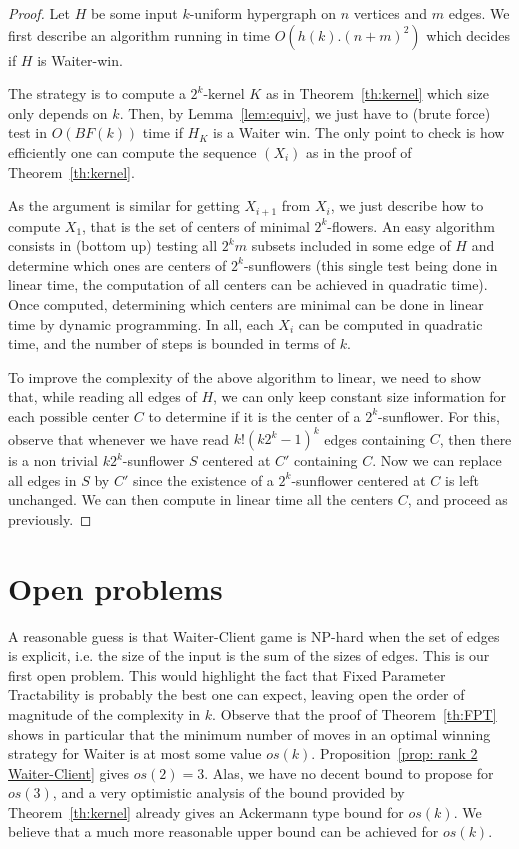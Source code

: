 \documentclass{article}
\newcommand{\hedge}{edge\xspace}
\newcommand{\hedges}{edges\xspace}
\begin{document}
\begin{proof}
Let $H$ be some input $k$-uniform hypergraph on $n$ vertices and $m$ \hedges. We first describe an algorithm running in time $O(h(k).(n+m)^2)$ which decides if $H$ is Waiter-win. 

The strategy is to compute a $2^k$-kernel $K$ as in Theorem~\ref{th:kernel} which size only depends on $k$. Then, by Lemma~\ref{lem:equiv}, we just have to (brute force) test in $O(BF(k))$ time if $H_K$ is a Waiter win. The only point to check is how efficiently one can compute the sequence $(X_i)$ as in the proof of Theorem~\ref{th:kernel}.

As the argument is similar for getting $X_{i+1}$ from $X_i$, we just describe how to compute $X_1$, that is the set of centers of minimal $2^k$-flowers. An easy algorithm consists in (bottom up) testing  all $2^k m$ subsets included in some \hedge of $H$ and determine which ones are centers of $2^k$-sunflowers (this single test being done in linear time, the computation of all centers can be achieved in quadratic time). Once computed, determining which centers are minimal can be done in linear time by dynamic programming. In all, each $X_i$ can be computed in quadratic time, and the number of steps is bounded in terms of $k$.

To improve the complexity of the above algorithm to linear, we need to show that, while reading all \hedges of $H$, we can only keep constant size information for each possible center $C$ to determine if it is the center of a $2^k$-sunflower. For this, observe that whenever we have read $k!(k2^k-1)^k$ \hedges containing $C$, then there is a non trivial $k2^k$-sunflower $S$ centered at $C'$ containing $C$. Now we can replace all \hedges in $S$ by $C'$ since the existence of a $2^k$-sunflower centered at $C$ is left unchanged. We can then compute in linear time all the centers $C$, and proceed as previously.
\end{proof}



\section{Open problems} \label{sec: open}

A reasonable guess is that Waiter-Client game is NP-hard when the set of \hedges is explicit, i.e. the size of the input is the sum of the sizes of \hedges. This is our first open problem. This would highlight the fact that Fixed Parameter Tractability is probably the best one can expect, leaving open the order of magnitude of the complexity in $k$. Observe that the proof of Theorem~\ref{th:FPT} shows in particular that the minimum number of moves in an optimal winning strategy for Waiter is at most some value $os(k)$. Proposition~\ref{prop: rank 2 Waiter-Client} gives $os(2)=3$. Alas, we have no decent bound to propose for $os(3)$, and a very optimistic analysis of the bound provided by Theorem~\ref{th:kernel} already gives an Ackermann type bound for $os(k)$. We believe that a much more reasonable upper bound can be achieved for $os(k)$.
\end{document}
